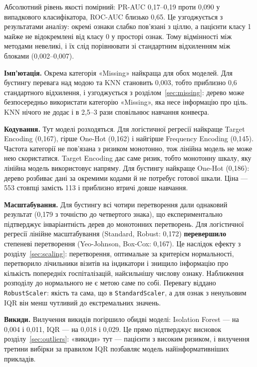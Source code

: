 \documentclass[14pt,a4paper]{extreport}
\begin{document}
Абсолютний рівень якості помірний: PR-AUC 0,17--0,19 проти 0,090 у випадкового класифікатора, ROC-AUC близько 0,65. Це узгоджується з результатами аналізу: окремі ознаки слабко пов'язані з ціллю, а пацієнти класу 1 майже не відокремлені від класу 0 у просторі ознак. Тому відмінності між методами невеликі, і їх слід порівнювати зі стандартним відхиленням між блоками (0,002--0,007).

\textbf{Імп'ютація.} Окрема категорія «Missing» найкраща для обох моделей. Для бустингу перевага над модою та KNN становить 0,003, тобто приблизно 0,6 стандартного відхилення, і узгоджується з розділом~\ref{sec:missing}: дерево може безпосередньо використати категорію «Missing», яка несе інформацію про ціль. KNN нічого не додає і в 2,5--3 рази сповільнює навчання конвеєра.

\textbf{Кодування.} Тут моделі розходяться. Для логістичної регресії найкраще Target Encoding (0,167), гірше One-Hot (0,162) і найгірше Frequency Encoding (0,145). Частота категорії не пов'язана з ризиком монотонно, тож лінійна модель не може нею скористатися. Target Encoding дає саме ризик, тобто монотонну шкалу, яку лінійна модель використовує напряму. Для бустингу найкраще One-Hot (0,186): дерево розбиває дані за окремими кодами й не потребує готової шкали. Ціна --- 553 стовпці замість 113 і приблизно втричі довше навчання.

\textbf{Масштабування.} Для бустингу всі чотири перетворення дали однаковий результат (0,179 з точністю до четвертого знака), що експериментально підтверджує інваріантність дерев до монотонних перетворень. Для логістичної регресії лінійне масштабування (Standard, Robust: 0,172) \textbf{перевершило} степеневі перетворення (Yeo-Johnson, Box-Cox: 0,167). Це наслідок ефекту з розділу~\ref{sec:scaling}: перетворення, оптимальне за критерієм нормальності, перетворило лічильники візитів на індикатори і знищило інформацію про кількість попередніх госпіталізацій, найсильнішу числову ознаку. Наближення розподілу до нормального не є метою саме по собі. Перевагу віддано \texttt{RobustScaler}: якість та сама, що в \texttt{StandardScaler}, а для ознак з ненульовим IQR він менш чутливий до екстремальних значень.

\textbf{Викиди.} Вилучення викидів погіршило обидві моделі: Isolation Forest --- на 0,004 і 0,011, IQR --- на 0,018 і 0,029. Це прямо підтверджує висновок розділу~\ref{sec:outliers}: «викиди» тут --- пацієнти з високим ризиком, і вилучення третини вибірки за правилом IQR позбавляє модель найінформативніших прикладів.
\end{document}
